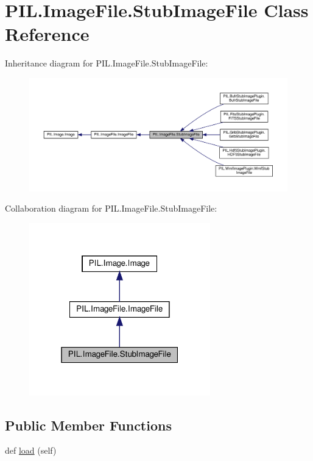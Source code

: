 \hypertarget{classPIL_1_1ImageFile_1_1StubImageFile}{}\section{P\+I\+L.\+Image\+File.\+Stub\+Image\+File Class Reference}
\label{classPIL_1_1ImageFile_1_1StubImageFile}


Inheritance diagram for P\+I\+L.\+Image\+File.\+Stub\+Image\+File\+:
\nopagebreak
\begin{figure}[H]
\begin{center}
\leavevmode
\includegraphics[width=350pt]{classPIL_1_1ImageFile_1_1StubImageFile__inherit__graph}
\end{center}
\end{figure}


Collaboration diagram for P\+I\+L.\+Image\+File.\+Stub\+Image\+File\+:
\nopagebreak
\begin{figure}[H]
\begin{center}
\leavevmode
\includegraphics[width=223pt]{classPIL_1_1ImageFile_1_1StubImageFile__coll__graph}
\end{center}
\end{figure}
\subsection*{Public Member Functions}
\begin{DoxyCompactItemize}
\item 
def \hyperlink{classPIL_1_1ImageFile_1_1StubImageFile_a718cdbea1ab0b6628bc32ef1d70cc681}{load} (self)
\end{DoxyCompactItemize}
